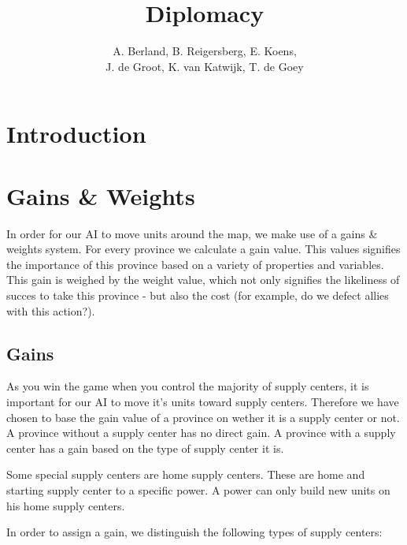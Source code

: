 \documentclass[a4paper]{article} %
\title{Diplomacy}
\author{A. Berland, B. Reigersberg, E. Koens, \\J. de Groot, K. van Katwijk, T. de Goey}
\begin{document}
\maketitle
\tableofcontents
\newpage

\section{Introduction}

\section{Gains \& Weights}

In order for our AI to move units around the map, we make use of a gains \& weights system. For every province we calculate a gain value. This values signifies the importance of this province based on a variety of properties and variables. This gain is weighed by the weight value, which not only signifies the likeliness of succes to take this province - but also the cost (for example, do we defect allies with this action?).

\subsection{Gains}
As you win the game when you control the majority of supply centers, it is important for our AI to move it's units toward supply centers. Therefore we have chosen to base the gain value of a province on wether it is a supply center or not. A province without a supply center has no direct gain. A province with a supply center has a gain based on the type of supply center it is. 

Some special supply centers are home supply centers. These are home and starting supply center to a specific power. A power can only build new units on his home supply centers.   

In order to assign a gain, we distinguish the following types of supply centers: 
\end{document}
